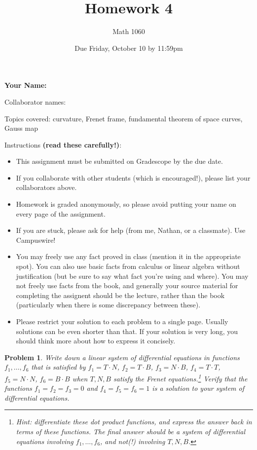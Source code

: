 \documentclass[11pt]{article}
\author{Math 1060}
\date{Due Friday, October 10 by 11:59pm}
\title{Homework 4}
\newtheorem{problem}{Problem}
\begin{document}
\maketitle


{\bf\Large Your Name:} 

Collaborator names: 


\vspace{.3in}
Topics covered: curvature, Frenet frame, fundamental theorem of space curves, Gauss map

Instructions {\bf (read these carefully!)}: 
\begin{itemize}
\item This assignment must be submitted on Gradescope by the due date. 
\item If you collaborate with other students (which is encouraged!), please list your collaborators above. 
\item Homework is graded anonymously, so please avoid putting your name on every page of the assignment.
\item If you are stuck, please ask for help (from me, Nathan, or a classmate). Use Campuswire!  
\item You may freely use any fact proved in class (mention it in the appropriate spot). You can also use basic facts from calculus or linear algebra without justification (but be sure to say what fact you're using and where). You may not freely use facts from the book, and generally your source material for completing the assignent should be the lecture, rather than the book (particularly when there is some discrepancy between these). 
\item Please restrict your solution to each problem to a single page. Usually solutions can be even shorter than that. If your solution is very long, you should think more about how to express it concisely.
\end{itemize}
\pagebreak 


\begin{problem}
Write down a linear system of differential equations in functions $f_1,\ldots,f_6$ that is satisfied by $f_1=T\cdot N$, $f_2=T\cdot B$, $f_3=N\cdot B$, $f_4=T\cdot T$, $f_5=N\cdot N$, $f_6=B\cdot B$ when $T,N,B$ satisfy the Frenet equations.\footnote{Hint: differentiate these dot product functions, and express the answer back in terms of these functions. The final answer should be a system of differential equations involving $f_1,\ldots,f_6$, and \emph{not(!)}  involving $T,N,B$.} Verify that the functions $f_1=f_2=f_3=0$ and $f_4=f_5=f_6=1$ is a solution to your system of differential equations.
\end{problem}
\end{document}
